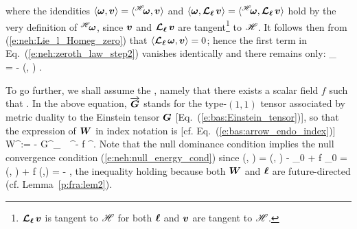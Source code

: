 where the idendities $\langle \bm{\omega}, \bm{v} \rangle = \langle {}^{\mathscr{H}}\!\bm{\omega}, \bm{v} \rangle$
and $\langle \bm{\omega}, \bm{\mathcal{L}}_{\bm{\ell}}\, \bm{v} \rangle =  \langle {}^{\mathscr{H}}\!\bm{\omega}, \bm{\mathcal{L}}_{\bm{\ell}}\, \bm{v} \rangle$
hold by the very definition of ${}^{\mathscr{H}}\!\bm{\omega}$,
since $\bm{v}$ and $\bm{\mathcal{L}}_{\bm{\ell}}\,\bm{v}$ are tangent\footnote{$\bm{\mathcal{L}}_{\bm{\ell}}\,\bm{v}$ is tangent to
$\mathscr{H}$ for both $\bm{\ell}$ and $\bm{v}$ are tangent to $\mathscr{H}$.}
to $\mathscr{H}$. It follows then from (\ref{e:neh:Lie_l_Homeg_zero}) that $\langle \bm{\mathcal{L}}_{\bm{\ell}}\, \bm{\omega}, \bm{v} \rangle = 0$; hence the
first term in Eq.~(\ref{e:neh:zeroth_law_step2}) vanishes identically and there remains
only:
\be \label{e:neh:DS_kappa_W}
    \wnab_{} \, \kappa = - (\wl, ) .
\ee

To go further, we shall assume the
 \cite{Racz08}, namely that there
exists a scalar field $f$ such that
\be \label{e:neh:null_dominant_cond}
   .
\ee
In the above equation, $\overrightarrow{\bm{G}}$ stands for the type-$(1,1)$ tensor
associated by metric duality to the Einstein tensor
$\bm{G}$ [Eq.~(\ref{e:bas:Einstein_tensor})], so that the expression of $\bm{W}$
in index notation is [cf. Eq.~(\ref{e:bas:arrow_endo_index})]
\be \label{e:neh:def_W_index}
    W^\alpha := - G^\alpha_{\ \, \mu} \el^\mu - f \ell^\alpha .
\ee
Note that the null dominance condition implies the null convergence condition
(\ref{e:neh:null_energy_cond}) since
\be \label{e:neh:R_ll_W_l}
    (\wl, \wl) = (\wl, \wl) -  _{0}
    + f _{0}  =  (\wl, \wl) + f (\wl,\wl)
     =  - \cdot\wl {} ,
\ee
the inequality holding because both $\bm{W}$ and $\bm{\ell}$ are future-directed
(cf. Lemma~\ref{p:fra:lem2}).

